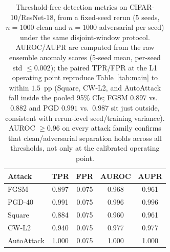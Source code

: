 \begin{table}[t]
\centering
\small

\caption{%
  Attack detection results generated directly from the Vast.ai result JSONs.
  TPR is adversarial detection rate; FPR is clean false-positive rate.
  The final row is the unweighted mean of the five per-attack TPRs (a
  macro-average across attack families), \emph{not} a pooled-binomial
  meta-estimate over the $25{,}000$ adversarials; with equal per-attack
  $n{=}5000$ the two point estimates coincide ($0.939$), so we report the
  macro-average and claim no pooled confidence interval for it.
  The \emph{AutoAttack (ensemble)} row is the detection rate on the
  standard AutoAttack ensemble's final (per-image worst-case)
  adversarials, which are dominated by high-confidence gradient
  perturbations; it is \emph{not} a claim about every component in
  isolation. Per-sub-attack detection is broken out in
  Appendix~\ref{app:autoattack}, where the weakest standalone component
  (black-box Square) is detected at $0.706$ @ L1 and APGD-DLR at $0.911$
  @ L1.
}
\label{tab:main}
\end{table}

\begin{table}[t]
\centering
\small
\begin{tabular}{lcccc}
\toprule
Attack & TPR & FPR & AUROC & AUPR \\
\midrule
FGSM & 0.897 & 0.075 & 0.968 & 0.961 \\
PGD-40 & 0.991 & 0.075 & 0.996 & 0.996 \\
Square & 0.884 & 0.075 & 0.960 & 0.961 \\
CW-L2 & 0.940 & 0.075 & 0.977 & 0.977 \\
AutoAttack & 1.000 & 0.075 & 1.000 & 1.000 \\
\bottomrule
\end{tabular}
\caption{Threshold-free detection metrics on CIFAR-10/ResNet-18, from a fixed-seed
rerun (5 seeds, $n{=}1000$ clean and $n{=}1000$ adversarial per seed) under the
same disjoint-window protocol. AUROC/AUPR are computed from the raw ensemble
anomaly scores (5-seed mean, per-seed std $\le 0.002$); the paired TPR/FPR at the
L1 operating point reproduce Table~\ref{tab:main} to within $1.5$~pp
(Square, CW-L2, and AutoAttack fall inside the pooled 95\% CIs; FGSM
$0.897$ vs.\ $0.882$ and PGD $0.991$ vs.\ $0.987$ sit just outside,
consistent with rerun-level seed/training variance). AUROC
$\ge 0.96$ on every attack family confirms that clean/adversarial separation holds
across all thresholds, not only at the calibrated operating point.}
\label{tab:auroc}
\end{table}

